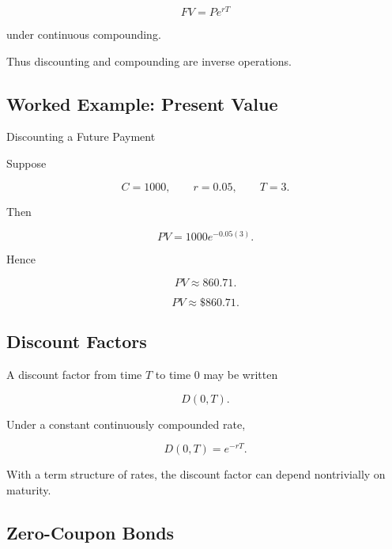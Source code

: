 \[
\boxed{
FV
=
Pe^{rT}
}
\]

under continuous compounding.

Thus discounting and compounding are inverse operations.

\subsection{Worked Example: Present Value}
\label{subsec:worked-present-value}

\begin{workedexamplebox}{Discounting a Future Payment}

Suppose

\[
C=1000,
\qquad
r=0.05,
\qquad
T=3.
\]

Then

\[
PV
=
1000e^{-0.05(3)}.
\]

Hence

\[
PV
\approx
860.71.
\]

\begin{answerbox}
\[
\boxed{
PV\approx \$860.71.
}
\]
\end{answerbox}

\end{workedexamplebox}

\subsection{Discount Factors}
\label{subsec:discount-factors}

A discount factor from time \(T\) to time \(0\) may be written

\[
\boxed{
D(0,T).
}
\]

Under a constant continuously compounded rate,

\[
\boxed{
D(0,T)
=
e^{-rT}.
}
\]

With a term structure of rates, the discount factor can depend nontrivially on
maturity.

\subsection{Zero-Coupon Bonds}
\label{subsec:zero-coupon-bonds}

